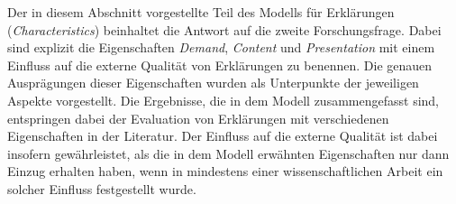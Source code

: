 \smallskip

Der in diesem Abschnitt vorgestellte Teil des Modells für Erklärungen (\textit{Characteristics}) beinhaltet die Antwort auf die zweite Forschungsfrage. Dabei sind explizit die Eigenschaften \textit{Demand}, \textit{Content} und \textit{Presentation} mit einem Einfluss auf die externe Qualität von Erklärungen zu benennen. Die genauen Ausprägungen dieser Eigenschaften wurden als Unterpunkte der jeweiligen Aspekte vorgestellt. Die Ergebnisse, die in dem Modell zusammengefasst sind, entspringen dabei der Evaluation von Erklärungen mit verschiedenen Eigenschaften in der Literatur. Der Einfluss auf die externe Qualität ist dabei insofern gewährleistet, als die in dem Modell erwähnten Eigenschaften nur dann Einzug erhalten haben, wenn in mindestens einer wissenschaftlichen Arbeit ein solcher Einfluss festgestellt wurde.